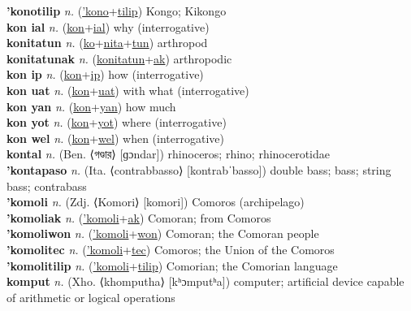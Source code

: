 \textbf{'konotilip} \textit{n.} (\hyperref['kono]{'kono}+\hyperref[tilip]{tilip})
Kongo; Kikongo \label{'konotilip} \\
\textbf{kon ial} \textit{n.} (\hyperref[kon]{kon}+\hyperref[al]{ial})
why (interrogative) \label{kon ial} \\
\textbf{konitatun} \textit{n.} (\hyperref[ko]{ko}+\hyperref[nita]{nita}+\hyperref[tun]{tun})
arthropod \label{konitatun} \\
\textbf{konitatunak} \textit{n.} (\hyperref[konitatun]{konitatun}+\hyperref[ak]{ak})
arthropodic \label{konitatunak} \\
\textbf{kon ip} \textit{n.} (\hyperref[kon]{kon}+\hyperref[p]{ip})
how (interrogative) \label{kon ip} \\
\textbf{kon uat} \textit{n.} (\hyperref[kon]{kon}+\hyperref[at]{uat})
with what (interrogative) \label{kon uat} \\
\textbf{kon yan} \textit{n.} (\hyperref[kon]{kon}+\hyperref[an]{yan})
how much \label{kon yan} \\
\textbf{kon yot} \textit{n.} (\hyperref[kon]{kon}+\hyperref[ot]{yot})
where (interrogative) \label{kon yot} \\
\textbf{kon wel} \textit{n.} (\hyperref[kon]{kon}+\hyperref[el]{wel})
when (interrogative) \label{kon wel} \\
\textbf{kontal} \textit{n.} (Ben. ⟨গণ্ডার⟩ [ɡɔndar])
rhinoceros; rhino; rhinocerotidae \label{kontal} \\
\textbf{'kontapaso} \textit{n.} (Ita. ⟨contrabbasso⟩ [kontrabˈbasso])
double bass; bass; string bass; contrabass \label{'kontapaso} \\
\textbf{'komoli} \textit{n.} (Zdj. ⟨Komori⟩ [komori])
Comoros (archipelago) \label{'komoli} \\
\textbf{'komoliak} \textit{n.} (\hyperref['komoli]{'komoli}+\hyperref[ak]{ak})
Comoran; from Comoros \label{'komoliak} \\
\textbf{'komoliwon} \textit{n.} (\hyperref['komoli]{'komoli}+\hyperref[won]{won})
Comoran; the Comoran people \label{'komoliwon} \\
\textbf{'komolitec} \textit{n.} (\hyperref['komoli]{'komoli}+\hyperref[tec]{tec})
Comoros; the Union of the Comoros \label{'komolitec} \\
\textbf{'komolitilip} \textit{n.} (\hyperref['komoli]{'komoli}+\hyperref[tilip]{tilip})
Comorian; the Comorian language \label{'komolitilip} \\
\textbf{komput} \textit{n.} (Xho. ⟨khomputha⟩ [kʰɔmputʰa])
computer; artificial device capable of arithmetic or logical operations \label{komput} \\
